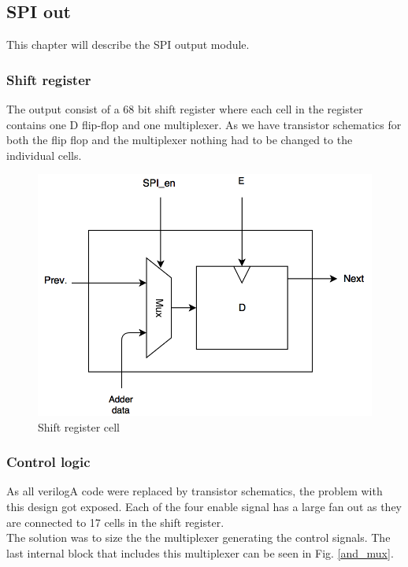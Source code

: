 
 \newpage
\subsection{SPI out}
This chapter will describe the SPI output module.

\subsubsection{Shift register}
The output consist of a 68 bit shift register where each cell in the register contains one D flip-flop and one multiplexer. As we have transistor schematics for both the flip flop and the multiplexer nothing had to be changed to the individual cells.

\begin{figure}[H]
\centering
\captionsetup{justification=centering}
\includegraphics[scale=0.35]{../figures/MUX_DFF.png}
\caption{Shift register cell}
\label{mux_dff}
\end{figure}

\newpage

\subsubsection{Control logic}
As all verilogA code were replaced by transistor schematics, the problem with this design got exposed. Each of the four enable signal has a large fan out as they are connected to 17 cells in the shift register. \\
The solution was to size the the multiplexer generating the control signals. The last internal block that includes this multiplexer can be seen in Fig. \ref{and_mux}. 

